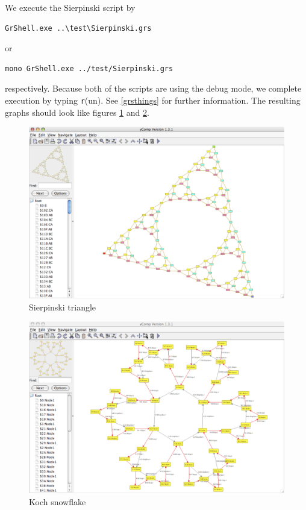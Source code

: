 We execute the Sierpinski script by
\begin{verbatim}
GrShell.exe ..\test\Sierpinski.grs
\end{verbatim}
or
\begin{verbatim}
mono GrShell.exe ../test/Sierpinski.grs
\end{verbatim}
respectively. Because both of the scripts are using the debug mode, we complete execution by typing \texttt{r}(un). See \ref{grsthings} for further information. The resulting graphs should look like figures \ref{figsierp} and \ref{figsnowflake}.
\begin{figure}[htbp]
  \centering
  \includegraphics[width=\textwidth]{fig/sierpinski}
  \caption{Sierpinski triangle}
  \label{figsierp}
\end{figure}
\begin{figure}[htbp]
  \centering
  \includegraphics[width=\textwidth]{fig/snowflake}
  \caption{Koch snowflake}
  \label{figsnowflake}
\end{figure}
\vfill\pagebreak

